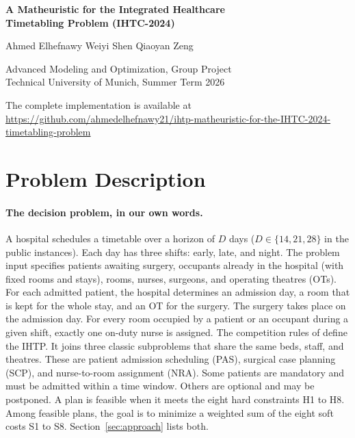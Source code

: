 \documentclass[11pt]{article}
\newcommand{\Sc}[1]{\textsf{S#1}}
\newcommand{\Hc}[1]{\textsf{H#1}}
\begin{document}
	
	\hypersetup{pageanchor=false}
	\begin{titlepage}
		\centering
		\vspace*{4.5cm}
		{\LARGE\textbf{A Matheuristic for the Integrated Healthcare\\[4pt] Timetabling Problem (IHTC-2024)}\par}
		\vspace{1.6cm}
		{\large Ahmed Elhefnawy \qquad Weiyi Shen \qquad Qiaoyan Zeng\par}
		\vspace{0.8cm}
		{Advanced Modeling and Optimization, Group Project\\ Technical University of Munich, Summer Term 2026\par}
		\vfill
		\begin{flushleft}
			{\small The complete implementation is available at\\
			{\footnotesize\url{https://github.com/ahmedelhefnawy21/ihtp-matheuristic-for-the-IHTC-2024-timetabling-problem}}\par}
		\end{flushleft}
	\end{titlepage}
	\pagestyle{empty}
	\tableofcontents
	\thispagestyle{empty}
	\newpage
	\pagestyle{plain}
	\hypersetup{pageanchor=true}
	
	\section{Problem Description}\label{sec:problem}

	\paragraph{The decision problem, in our own words.}
	A hospital schedules a timetable over a horizon of $D$ days ($D\in\{14,21,28\}$ in the public instances). Each day has three shifts:
	early, late, and night. The problem input specifies patients awaiting surgery, occupants already in the
	hospital (with fixed rooms and stays), rooms, nurses, surgeons, and operating theatres (OTs). For
	each admitted patient, the hospital determines an admission day, a room that is kept for the whole
	stay, and an OT for the surgery. The surgery takes place on the admission day. For every room occupied by
	a patient or an occupant during a given shift, exactly one on-duty nurse is assigned. The competition rules of \citet{ihtc2024spec} define the IHTP. It joins three classic subproblems \citep{ceschia2011,cardoen2010,burke2004} that share the same beds, staff, and theatres. These are patient admission scheduling (PAS), surgical case planning (SCP), and nurse-to-room assignment (NRA).
	Some patients are mandatory and must be admitted within a time window. Others are optional and may
	be postponed. A plan is feasible when it meets the eight hard constraints \Hc1 to \Hc8. Among feasible plans, the goal is to minimize a weighted sum of the eight soft costs \Sc1 to \Sc8. Section~\ref{sec:approach} lists both.
	
\end{document}
